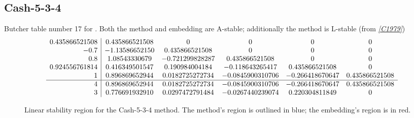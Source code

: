 \documentclass[letterpaper,10pt,english]{sphinxmanual}
\begin{document}
\subsection{Cash-5-3-4}
\label{Butcher:butcher-cash-5-3-4}\label{Butcher:cash-5-3-4}
Butcher table number 17
for {\hyperref[c_interface/User_callable:c.ARKodeSetIRKTableNum]{\emph{}}}.  Both the
method and embedding are A-stable; additionally the method is L-stable
(from \label{Butcher:id16}{\hyperref[References:c1979]{\emph{{[}C1979{]}}}})
\begin{gather}
\begin{split}\begin{array}{r|ccccc}
  0.435866521508 & 0.435866521508 & 0 & 0 & 0 & 0 \\
  -0.7 & -1.13586652150 & 0.435866521508 & 0 & 0 & 0 \\
  0.8 & 1.08543330679 & -0.721299828287 & 0.435866521508 & 0 & 0 \\
  0.924556761814 & 0.416349501547 & 0.190984004184 & -0.118643265417 & 0.435866521508 & 0 \\
  1 & 0.896869652944 & 0.0182725272734 & -0.0845900310706 & -0.266418670647 & 0.435866521508 \\
  \hline
  4 & 0.896869652944 & 0.0182725272734 & -0.0845900310706 & -0.266418670647 & 0.435866521508 \\
  3 & 0.776691932910 & 0.0297472791484 & -0.0267440239074 & 0.220304811849 & 0
\end{array}\end{split}\notag
\end{gather}\begin{figure}[htbp]
\centering
\capstart

\caption{Linear stability region for the Cash-5-3-4 method.  The method's
region is outlined in blue; the embedding's region is in red.}\end{figure}
\end{document}
